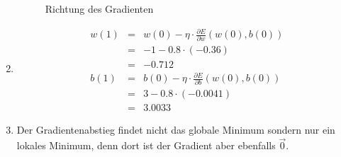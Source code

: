 \documentclass[DIN, pagenumber=false, fontsize=11pt, parskip=half]{scrartcl}
\begin{document}
\begin{enumerate}[label=(\alph*)]
\begin{figure}[H]
                \centering
                \caption{Richtung des Gradienten}
            \end{figure}
        \item
            \begin{eqnarray*}
                w(1) &=& w(0) - \eta \cdot \frac{\partial E}{\partial w}(w(0),b(0)) \\
                &=& -1 - 0.8 \cdot (-0.36) \\
                &=& -0.712 \\
                b(1) &=& b(0) - \eta \cdot \frac{\partial E}{\partial b}(w(0), b(0)) \\
                &=& 3 - 0.8 \cdot (-0.0041) \\
                &=& 3.0033
            \end{eqnarray*}
        \item Der Gradientenabstieg findet nicht das globale Minimum sondern nur ein lokales Minimum, denn dort ist der Gradient aber ebenfalls $\vec{0}$.
    \end{enumerate}
\end{document}
